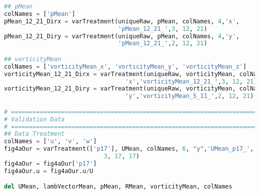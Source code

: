 \documentclass[../main.tex]{subfiles}
\begin{document}
\begin{lstlisting}[language=python]
## pMean
colNames = ['pMean']
pMean_12_21_Dirx = varTreatment(uniqueRaw, pMean, colNames, 4,'x',
                                'pMean_12_21_',3, 12, 21)
pMean_12_21_Diry = varTreatment(uniqueRaw, pMean, colNames, 4,'y',
                                'pMean_12_21_',2, 12, 21)

## vorticityMean
colNames = ['vorticityMean_x', 'vorticityMean_y', 'vorticityMean_z']
vorticityMean_12_21_Dirx = varTreatment(uniqueRaw, vorticityMean, colNames, 6,
                                  'x','vorticityMean_12_21_',3, 12, 21)
vorticityMean_12_21_Diry = varTreatment(uniqueRaw, vorticityMean, colNames, 6,
                                  'y','vorticityMean_5_11_',2, 12, 21)

# =============================================================================
# Validation Data
# =============================================================================
## Data Treatment
colNames = ['u', 'v', 'w']
fig4aOur = varTreatment(['p17'], UMean, colNames, 6, "y",'UMean_p17_',
                            3, 17, 17)
fig4aOur = fig4aOur['p17']
fig4aOur.u = fig4aOur.u/U

del UMean, lambVectorMean, pMean, RMean, vorticityMean, colNames

\end{lstlisting}
\end{document}
